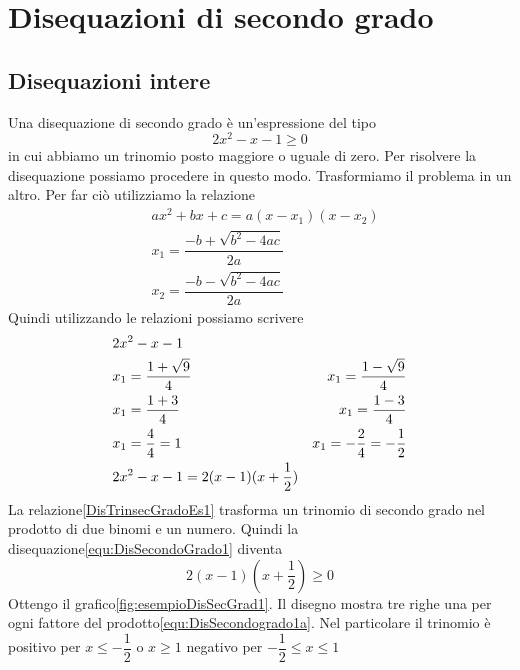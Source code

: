 \chapter{Disequazioni di secondo grado}
\label{cha:Disequazionisecondogrado}
\section{Disequazioni intere}
Una disequazione di secondo grado è un'espressione del tipo
\begin{equation}
2x^2-x-1\geq 0\label{equ:DisSecondoGrado1}
\end{equation} 
in cui abbiamo un trinomio posto maggiore o uguale di zero. Per risolvere la disequazione  possiamo procedere in questo modo. Trasformiamo  il problema in un altro. Per far ciò  utilizziamo la relazione
\begin{align}
&ax^2+bx+c=a(x-x_{1})(x-x_{2})\label{DisTrinsecGrado0}\\
&x_{1}=\dfrac{-b+\sqrt{b^2-4ac}}{2a}\label{DisTrinsecGrado1}\\
&x_{2}=\dfrac{-b-\sqrt{b^2-4ac}}{2a}\label{DisTrinsecGrado2}
\end{align}
Quindi utilizzando le relazioni\nobs{} possiamo scrivere 
\begin{align}
&2x^2-x-1\\
&x_{1}=\dfrac{1+\sqrt{9}}{4}\notag
&x_{1}=\dfrac{1-\sqrt{9}}{4}\notag\\
&x_{1}=\dfrac{1+3}{4}\notag
&x_{1}=\dfrac{1-3}{4}\notag\\
&x_{1}=\dfrac{4}{4}=1\notag
&x_{1}=-\dfrac{2}{4}=-\dfrac{1}{2}\notag\\
&2x^2-x-1=2(x-1)(x+\dfrac{1}{2})\label{DisTrinsecGradoEs1}
\end{align}
La relazione\nobs\vref{DisTrinsecGradoEs1} trasforma un trinomio di secondo grado nel prodotto di due binomi e un numero. Quindi la disequazione\nobs\vref{equ:DisSecondoGrado1} diventa 
\begin{equation}
2(x-1)(x+\dfrac{1}{2})\geq 0\label{equ:DisSecondogrado1a}
\end{equation} 
Ottengo il grafico\nobs\vref{fig:esempioDisSecGrad1}. Il disegno mostra tre righe una per ogni fattore del prodotto\nobs\vref{equ:DisSecondogrado1a}. Nel particolare il trinomio è positivo per $x\leq-\dfrac{1}{2}$ o $x\geq 1$ negativo per $-\dfrac{1}{2}\leq x\leq 1$

